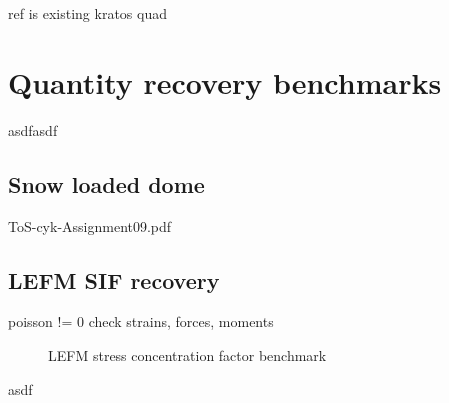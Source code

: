  

ref is existing kratos quad

\section{Quantity recovery benchmarks}

asdfasdf



\subsection{Snow loaded dome}

ToS-cyk-Assignment09.pdf

\subsection{LEFM SIF recovery}

poisson != 0
check strains, forces, moments

\begin{figure}[H]
	\caption{\label{Oscillating clamped plate benchmark}LEFM stress concentration factor benchmark}
\end{figure}

asdf